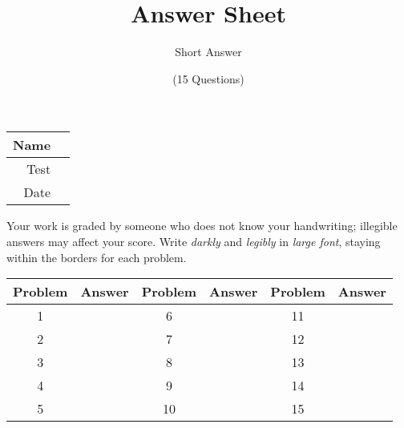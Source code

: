 \documentclass[a4paper, 12pt]{article}
\title{Answer Sheet}
\author{Short Answer}
\date{(15 Questions)}
\begin{document}
\maketitle

\begin{center}
\begin{tabular}{|r|r|}
\hline
	\hspace{3em} Name & \hspace{30em} \\\hline
	Test & \qquad \\ \hline
	Date & \qquad \\ \hline
\end{tabular}
\end{center}

Your work is graded by someone who does not know your handwriting; illegible answers may affect your score. Write \emph{darkly} and \emph{legibly} in \emph{large font}, staying within the borders for each problem.

\begin{center}
\begin{tabularx}{\textwidth}{|c|X|c|X|c|X|}\hline
	Problem & Answer & Problem & Answer & Problem & Answer \\\hline
	1 & \hspace{13.45em} & 6 & & 11 & \\\hline
	2 & & 7 & & 12 & \\\hline
	3 & & 8 & & 13 & \\\hline
	4 & & 9 & & 14 & \\\hline
	5 & & 10 & & 15 & \\\hline
\end{tabularx}
\end{center}
\end{document}
